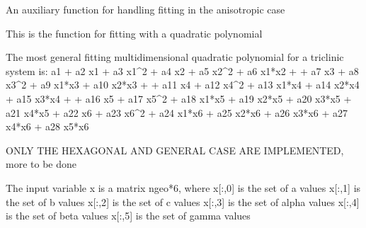 \documentclass[letterpaper,10pt,english]{sphinxmanual}
\begin{document}

\begin{fulllineitems}
\label{pyqha:pyqha.fitutils.fit_anis}
An auxiliary function for handling fitting in the anisotropic case

\end{fulllineitems}


\begin{fulllineitems}
\label{pyqha:pyqha.fitutils.fit_quadratic}
This is the function for fitting with a quadratic polynomial

The most general fitting multidimensional quadratic polynomial for a triclinic
system is:
a1 + a2 x1 + a3 x1\textasciicircum{}2 + a4  x2 + a5  x2\textasciicircum{}2 + a6 x1*x2 +    
+ a7  x3 + a8  x3\textasciicircum{}2 + a9  x1*x3 + a10 x2*x3 +         
+ a11 x4 + a12 x4\textasciicircum{}2 + a13 x1*x4 + a14 x2*x4 + a15 x3*x4 +        
+ a16 x5 + a17 x5\textasciicircum{}2 + a18 x1*x5 + a19 x2*x5 + a20 x3*x5 + a21 x4*x5 
+ a22 x6 + a23 x6\textasciicircum{}2 + a24 x1*x6 + a25 x2*x6 + a26 x3*x6 + a27 x4*x6 + a28 x5*x6

ONLY THE HEXAGONAL AND GENERAL CASE ARE IMPLEMENTED, more to be done

The input variable x is a matrix ngeo*6, where
x{[}:,0{]} is the set of a values  
x{[}:,1{]} is the set of b values  
x{[}:,2{]} is the set of c values  
x{[}:,3{]} is the set of alpha values  
x{[}:,4{]} is the set of beta values   
x{[}:,5{]} is the set of gamma values

\end{fulllineitems}

\end{document}
